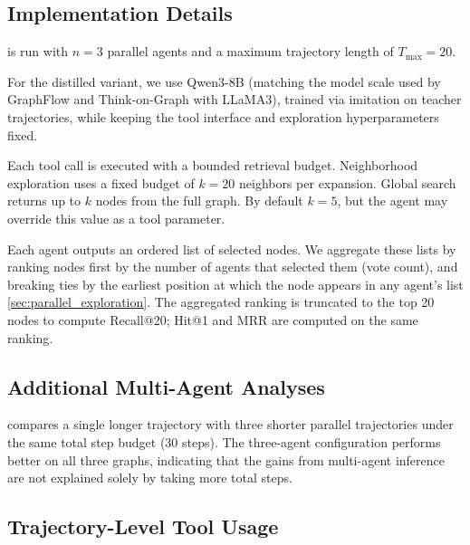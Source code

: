 \TabStarkStatistics

\subsection{Implementation Details}
\label{app:impl-details}

\retriever is run with $n{=}3$ parallel agents and a maximum trajectory length of $T_{\max}{=}20$. 

For the distilled variant, we use Qwen3-8B \cite{yang_qwen3_2025} (matching the model scale used by GraphFlow and Think-on-Graph with LLaMA3), trained via imitation on \retrieverShort teacher trajectories, while keeping the tool interface and exploration hyperparameters fixed.

Each tool call is executed with a bounded retrieval budget. Neighborhood exploration uses a fixed budget of $k{=}20$ neighbors per expansion. Global search returns up to $k$ nodes from the full graph. By default $k{=}5$, but the agent may override this value as a tool parameter.

Each agent outputs an ordered list of selected nodes. We aggregate these lists by ranking nodes first by the number of agents that selected them (vote count), and breaking ties by the earliest position at which the node appears in any agent’s list \cref{sec:parallel_exploration}. The aggregated ranking is truncated to the top 20 nodes to compute Recall@20; Hit@1 and MRR are computed on the same ranking.

\subsection{Additional Multi-Agent Analyses}
\label{app:budget-control}

\TabBudgetControlledComparison[h]

\noindent {} compares a single longer trajectory with three shorter parallel trajectories under the same total step budget (30 steps). The three-agent configuration performs better on all three graphs, indicating that the gains from multi-agent inference are not explained solely by taking more total steps.

\subsection{Trajectory-Level Tool Usage}
\label{app:trajectory-tool-usage}

\TabTrajectoryToolMixing[h]

